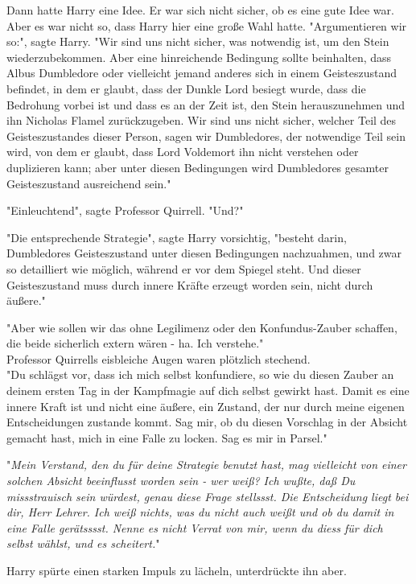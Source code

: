 {Dann hatte Harry eine Idee. Er war sich nicht sicher, ob es eine gute Idee war. Aber es war nicht so, dass Harry hier eine große Wahl hatte. "Argumentieren wir so:", sagte Harry. "Wir sind uns nicht sicher, was notwendig ist, um den Stein wiederzubekommen. Aber eine hinreichende Bedingung sollte beinhalten, dass Albus Dumbledore oder vielleicht jemand anderes sich in einem Geisteszustand befindet, in dem er glaubt, dass der Dunkle Lord besiegt wurde, dass die Bedrohung vorbei ist und dass es an der Zeit ist, den Stein herauszunehmen und ihn Nicholas Flamel zurückzugeben. Wir sind uns nicht sicher, welcher Teil des Geisteszustandes dieser Person, sagen wir Dumbledores, der notwendige Teil sein wird, von dem er glaubt, dass Lord Voldemort ihn nicht verstehen oder duplizieren kann; aber unter diesen Bedingungen wird Dumbledores gesamter Geisteszustand ausreichend sein."

"Einleuchtend", sagte Professor Quirrell. "Und?"

"Die entsprechende Strategie", sagte Harry vorsichtig, "besteht darin, Dumbledores Geisteszustand unter diesen Bedingungen nachzuahmen, und zwar so detailliert wie möglich, während er vor dem Spiegel steht. Und dieser Geisteszustand muss durch innere Kräfte erzeugt worden sein, nicht durch äußere."

"Aber wie sollen wir das ohne Legilimenz oder den Konfundus-Zauber schaffen, die beide sicherlich extern wären - ha. Ich verstehe."\\ Professor Quirrells eisbleiche Augen waren plötzlich stechend.\\ "Du schlägst vor, dass ich mich selbst konfundiere, so wie du diesen Zauber an deinem ersten Tag in der Kampfmagie auf dich selbst gewirkt hast. Damit es eine innere Kraft ist und nicht eine äußere, ein Zustand, der nur durch meine eigenen Entscheidungen zustande kommt. Sag mir, ob du diesen Vorschlag in der Absicht gemacht hast, mich in eine Falle zu locken. Sag es mir in Parsel."

"\emph{Mein Verstand, den du für deine Strategie benutzt hast, mag vielleicht von einer solchen Absicht beeinflusst worden sein - wer weiß? Ich wußte, daß Du missstrauisch sein würdest, genau diese Frage stellssst. Die Entscheidung liegt bei dir, Herr Lehrer. Ich weiß nichts, was du nicht auch weißt und ob du damit in eine Falle gerätsssst. Nenne es nicht Verrat von mir, wenn du diess für dich selbst wählst, und es scheitert.}"

Harry spürte einen starken Impuls zu lächeln, unterdrückte ihn aber.

}
